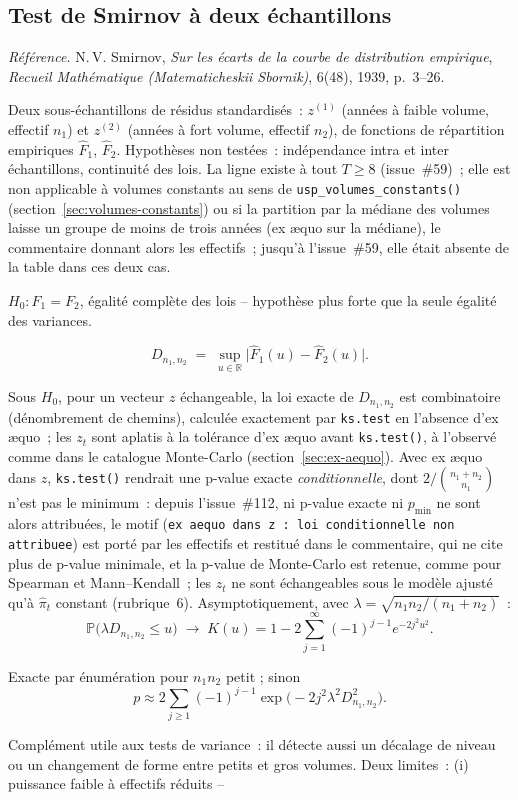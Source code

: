 \documentclass[a4paper,11pt]{article}
\newcommand{\code}[1]{\texttt{\small #1}}
\newcommand{\refl}[1]{{\small\textcolor{maincolor!70!black}{\textit{Référence.} #1}}\par\smallskip}
\newcounter{ficheid}
\newenvironment{fiche}[1]{%
  \stepcounter{ficheid}%
  \phantomsection
  \subsection{#1}%
  \label{fiche:\theficheid}%
}{%
  \end{description}\vspace{0.5em}%
}
\newcommand{\Cadre}{%
  \begin{description}[leftmargin=0pt, style=unboxed, itemsep=3pt, topsep=3pt, parsep=2pt]%
  \item[\textcolor{financeblue}{\textbf{1. Cadre, notations et hypothèses de validité (non testées).}}]}
\newcommand{\Hzero}{\item[\textcolor{financeblue}{\textbf{2. Hypothèse nulle.}}]}
\newcommand{\Stat}{\item[\textcolor{financeblue}{\textbf{3. Statistique de test.}}]}
\newcommand{\Loi}{\item[\textcolor{financeblue}{\textbf{4. Loi sous $H_0$.}}]}
\newcommand{\Pval}{\item[\textcolor{financeblue}{\textbf{5. p-value.}}]}
\newcommand{\Usage}{\item[\textcolor{financeblue}{\textbf{6. Usage et limites.}}]}
\begin{document}
\begin{fiche}{Test de Smirnov à deux échantillons}
\label{fiche:smirnov}%
\refl{N.\,V. Smirnov, \emph{Sur les écarts de la courbe de distribution empirique},
\emph{Recueil Mathématique (Matematicheskii Sbornik)}, 6(48), 1939, p.~3--26.}
\Cadre
Deux sous-échantillons de résidus standardisés~: $z^{(1)}$ (années à faible volume, effectif $n_1$)
et $z^{(2)}$ (années à fort volume, effectif $n_2$), de fonctions de répartition empiriques
$\hat F_1$, $\hat F_2$. Hypothèses non testées~: indépendance intra et inter échantillons,
continuité des lois. La ligne existe à tout $T \ge 8$ (issue~\#59)~; elle est non applicable
à volumes constants au sens de \code{usp\_volumes\_constants()}
(section~\ref{sec:volumes-constants}) ou si la partition par la médiane des volumes laisse un
groupe de moins de trois années (ex \ae quo sur la médiane), le commentaire donnant alors les
effectifs~; jusqu'à l'issue~\#59, elle était absente de la table dans ces deux cas.
\Hzero
$H_0 : F_1 = F_2$, égalité complète des lois -- hypothèse plus forte que la seule égalité des
variances.
\Stat
\[
  D_{n_1,n_2} \;=\; \sup_{u \in \mathbb{R}} \big| \hat F_1(u) - \hat F_2(u) \big| .
\]
\Loi
Sous $H_0$, pour un vecteur $z$ échangeable, la loi exacte de $D_{n_1,n_2}$ est combinatoire
(dénombrement de chemins), calculée exactement par \code{ks.test} en l'absence d'ex \ae quo~;
les $z_t$ sont aplatis à la tolérance d'ex \ae quo avant \code{ks.test()}, à l'observé comme dans
le catalogue Monte-Carlo (section~\ref{sec:ex-aequo}). Avec ex \ae quo dans $z$,
\code{ks.test()} rendrait une p-value exacte \emph{conditionnelle}, dont $2/\binom{n_1+n_2}{n_1}$
n'est pas le minimum~: depuis l'issue~\#112, ni p-value exacte ni $p_{\min}$ ne sont alors
attribuées, le motif (\code{ex aequo dans z~: loi conditionnelle non attribuee}) est porté par
les effectifs et restitué dans le commentaire, qui ne cite plus de p-value minimale, et la p-value
de Monte-Carlo est retenue, comme pour Spearman et Mann--Kendall~;
les $z_t$ ne sont échangeables sous le modèle ajusté qu'à $\hat\pi_t$ constant (rubrique~6).
Asymptotiquement, avec
$\lambda = \sqrt{n_1 n_2/(n_1+n_2)}$~:
\[
  \mathbb{P}\big(\lambda D_{n_1,n_2} \le u\big) \;\longrightarrow\;
  K(u) = 1 - 2\sum_{j=1}^{\infty} (-1)^{j-1} e^{-2 j^2 u^2}.
\]
\Pval
Exacte par énumération pour $n_1 n_2$ petit ; sinon
\[
  p \approx 2\sum_{j\ge1} (-1)^{j-1}\exp\!\big(-2 j^2 \lambda^2 D_{n_1,n_2}^2\big).
\]
\Usage
Complément utile aux tests de variance~: il détecte aussi un décalage de niveau ou un changement
de forme entre petits et gros volumes. Deux limites~: (i) puissance faible à effectifs réduits --

\end{fiche}
\end{document}

